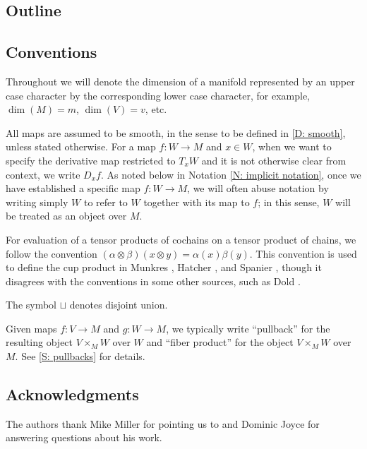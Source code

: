 

\subsection{Outline}



\subsection{Conventions}

Throughout we will denote the dimension of a manifold represented by an upper case character by the corresponding lower case character, for example, $\dim(M) = m$, $\dim(V) = v$, etc. 

All maps are assumed to be smooth, in the sense to be defined in \cref{D: smooth}, unless stated otherwise.
For a map $f \colon W \to M$ and $x \in W$, when we want to specify the derivative map restricted to $T_xW$ and it is not otherwise clear from context, we write $D_xf$.
As noted below in Notation \ref{N: implicit notation}, once we have established a specific map $f \colon W \to M$, we will often abuse notation by writing simply $W$ to refer to $W$ together with its map to $f$; in this sense, $W$ will be treated as an object over $M$.

For evaluation of a tensor products of cochains on a tensor product of chains, we follow the convention $(\alpha \otimes \beta)(x\otimes y) = \alpha(x)\beta(y)$.
This convention is used to define the cup product in Munkres \cite[Section 60]{Mun84}, Hatcher \cite[Section 3.2]{Hatc02}, and Spanier \cite[Section 5.6]{Span81}, though it disagrees with the conventions in some other sources, such as Dold \cite[Section VII.7]{Dol72}.

The symbol $\sqcup$ denotes disjoint union.

Given maps $f \colon V \to M$ and $g \colon W \to M$, we typically write ``pullback'' for the resulting object $V \times_M W$ over $W$ and ``fiber product'' for the object $V \times_M W$ over $M$.
See \cref{S: pullbacks} for details. 

\subsection{Acknowledgments}

The authors thank Mike Miller for pointing us to \cite{Lipy14} and Dominic Joyce for answering questions about his work.
